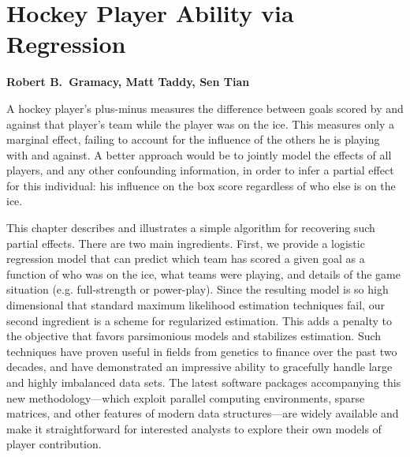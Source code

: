 
\chapter{Hockey Player Ability via Regression}

\noindent
{\bf Robert B.~Gramacy, Matt Taddy, Sen Tian}

\bigskip A hockey player's plus-minus measures the difference between goals
scored by and against that player's team while the player was on the ice.
This measures only a marginal effect, failing to account for the influence of
the others he is playing with and against.   A better approach would be to
jointly model the effects of all players, and any other confounding
information, in order to infer a partial effect for this individual: his
influence on the box score regardless of who else is on the ice.

This chapter describes and illustrates a  simple algorithm for recovering such
partial effects.  There are two main ingredients.  First, we provide a
logistic regression model that can predict which team has scored a given goal
as a function of who was on the ice, what teams were playing, and details of
the game situation (e.g. full-strength or power-play).  Since the resulting
model is so high dimensional that standard maximum likelihood estimation
techniques fail,  our second ingredient is a scheme for regularized
estimation.  This adds a penalty to the objective that favors parsimonious
models and stabilizes estimation.  Such techniques  have proven useful in
fields from genetics to finance over the past two decades, and have
demonstrated an impressive ability to gracefully handle large and highly
imbalanced data sets.  The latest software packages accompanying this new
methodology---which exploit parallel computing environments, sparse matrices,
and other features of modern data structures---are widely available and make
it straightforward for interested analysts to explore their own models of
player contribution.

